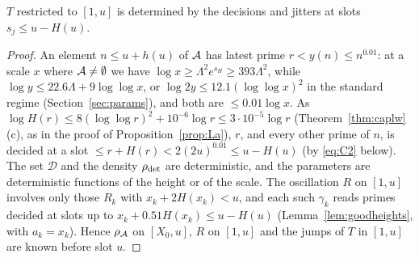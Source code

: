 \begin{lemma}[Adaptedness]\label{lem:adapted}
$T$ restricted to $[1,u]$ is determined by the decisions and jitters at slots $s_j\le u-H(u)$.
\end{lemma}
\begin{proof}
An element $n\le u+h(u)$ of $\mathcal{A}$ has latest prime $r<y(n)\le n^{0.01}$: at a scale $x$ where $\mathcal{A}\ne\emptyset$ we have
$\log x\ge\Lambda^2e^{s_H}\ge393\Lambda^2$, while $\log y\le22.6\Lambda+9\log\log x$, or $\log2y\le12.1(\log\log x)^2$ in the standard
regime (Section~\ref{sec:params}), and both are $\le0.01\log x$. As $\log H(r)\le8(\log\log r)^2+10^{-6}\log r\le3\cdot10^{-5}\log r$
(Theorem~\ref{thm:caplw}(c), as in the proof of Proposition~\ref{prop:La}), $r$, and every other prime of $n$, is decided at a slot
$\le r+H(r)<2(2u)^{0.01}\le u-H(u)$ (by \eqref{eq:C2} below). The set $\mathcal D$ and the density $\rho_{\mathrm{det}}$ are deterministic, and the
parameters are deterministic functions of the height or of the scale. The oscillation $R$ on $[1,u]$ involves only those $R_k$ with $x_k+2H(x_k)<u$, and each
such $\gamma_k$ reads primes decided at slots up to $x_k+0.51H(x_k)\le u-H(u)$ (Lemma~\ref{lem:goodheights}, with $a_k=x_k$). Hence $\rho_{\mathcal{A}}$ on $[X_0,u]$, $R$ on $[1,u]$ and
the jumps of $T$ in $[1,u]$ are known before slot $u$.
\end{proof}

